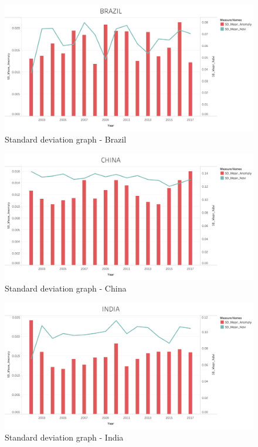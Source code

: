 \begin{itemize}
    \begin{figure}[H]
            \centering
             \includegraphics[width=1.0\linewidth]{figures/ch5/StandardDeviation/BRAZIL_SD.png}
            \caption{Standard deviation graph - Brazil}\label{Fig:BRAZIL_SD}
    \end{figure}
    
    \begin{figure}[H]
            \centering
            \includegraphics[width=1.0\linewidth]{figures/ch5/StandardDeviation/CHINA_SD.png}
            \caption{Standard deviation graph - China}\label{Fig:CHINA_SD}
    \end{figure}
    
    \begin{figure}[H]
            \centering
            \includegraphics[width=1.0\linewidth]{figures/ch5/StandardDeviation/INDIA_SD.png}
            \caption{Standard deviation graph - India}\label{Fig:INDIA_SD}
    \end{figure}
    

\end{itemize}
